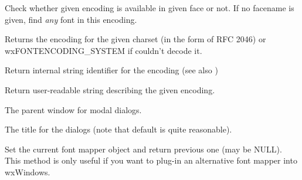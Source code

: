 \label{wxfontmapperisencodingavailable}


Check whether given encoding is available in given face or not.
If no facename is given, find {\it any} font in this encoding.

\label{wxfontmappercharsettoencoding}


Returns the encoding for the given charset (in the form of RFC 2046) or
wxFONTENCODING\_SYSTEM if couldn't decode it.

\label{wxfontmappergetencodingname}


Return internal string identifier for the encoding (see also 
)

\label{wxfontmappergetencodingdescription}


Return user-readable string describing the given encoding.

\label{wxfontmappersetdialogparent}


The parent window for modal dialogs.

\label{wxfontmappersetdialogtitle}


The title for the dialogs (note that default is quite reasonable).

\label{wxfontmapperset}


Set the current font mapper object and return previous one (may be NULL).
This method is only useful if you want to plug-in an alternative font mapper
into wxWindows.

